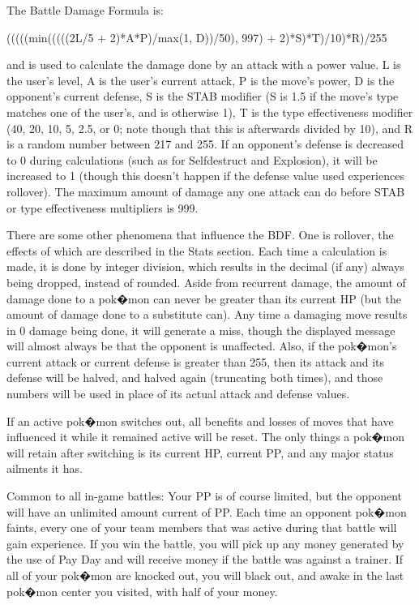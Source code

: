 \documentclass[reprint, aps, prl, paper=A4]{revtex4-1}
\begin{document}
The Battle Damage Formula is:

     (((((min(((((2L/5 + 2)*A*P)/max(1, D))/50), 997) + 2)*S)*T)/10)*R)/255

and is used to calculate the damage done by an attack with a power value. L is the user's
level, A is the user's current attack, P is the move's power, D is the opponent's current
defense, S is the STAB modifier (S is 1.5 if the move's type matches one of the user's, and is
otherwise 1), T is the type effectiveness modifier (40, 20, 10, 5, 2.5, or 0; note though that
this is afterwards divided by 10), and R is a random number between 217 and 255. If an
opponent's defense is decreased to 0 during calculations (such as for Selfdestruct and
Explosion), it will be increased to 1 (though this doesn't happen if the defense value used
experiences rollover). The maximum amount of damage any one attack can do before STAB or type
effectiveness multipliers is 999.

There are some other phenomena that influence the BDF. One is rollover, the effects of which
are described in the Stats section. Each time a calculation is made, it is done by integer
division, which results in the decimal (if any) always being dropped, instead of rounded.
Aside from recurrent damage, the amount of damage done to a pok�mon can never be greater than
its current HP (but the amount of damage done to a substitute can). Any time a damaging move
results in 0 damage being done, it will generate a miss, though the displayed message will
almost always be that the opponent is unaffected. Also, if the pok�mon's current attack or
current defense is greater than 255, then its attack and its defense will be halved, and halved
again (truncating both times), and those numbers will be used in place of its actual attack and
defense values.

If an active pok�mon switches out, all benefits and losses of moves that have influenced it
while it remained active will be reset. The only things a pok�mon will retain after switching
is its current HP, current PP, and any major status ailments it has.


Common to all in-game battles:
Your PP is of course limited, but the opponent will have an unlimited amount current of PP.
Each time an opponent pok�mon faints, every one of your team members that was active during
that battle will gain experience. If you win the battle, you will pick up any money generated
by the use of Pay Day and will receive money if the battle was against a trainer. If all of
your pok�mon are knocked out, you will black out, and awake in the last pok�mon center you
visited, with half of your money.
\end{document}
